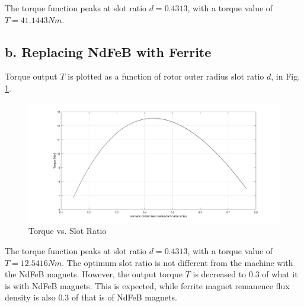 \documentclass[a4paper, 11pt, titlepage]{article}
\begin{document}
The torque function peaks at slot ratio $d=0.4313$, with a torque value of $T=41.1443Nm$.


\subsection{b. Replacing NdFeB with Ferrite}


Torque output $T$ is plotted as a function of rotor outer radius slot ratio $d$, in Fig. \ref{fig:TvsD_Ferrite}.
\begin{figure}[h]
	\includegraphics[width=\textwidth]{torquevsD_Ferrite.png}
	\caption{Torque vs. Slot Ratio}
	\label{fig:TvsD_Ferrite}
\end{figure}

The torque function peaks at slot ratio $d=0.4313$, with a torque value of $T=12.5416Nm$. The optimum slot ratio is not different from the machine with the NdFeB magnets. However, the output torque $T$ is decreased to $0.3$ of what it is with NdFeB magnets. This is expected, while ferrite magnet remanence flux density is also $0.3$ of that is of NdFeB magnets.
\end{document}
